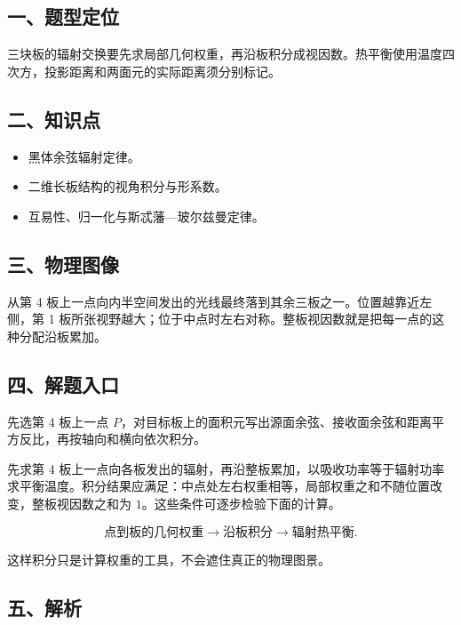 \documentclass[12pt,a4paper,UTF8]{ctexart}
\newcommand{\tightlist}{\setlength{\itemsep}{0pt}\setlength{\parskip}{0pt}}
\begin{document}
\subsection{一、题型定位}\label{ux4e00ux9898ux578bux5b9aux4f4d-5}

三块板的辐射交换要先求局部几何权重，再沿板积分成视因数。热平衡使用温度四次方，投影距离和两面元的实际距离须分别标记。

\subsection{二、知识点}\label{ux4e8cux77e5ux8bc6ux70b9-5}

\begin{itemize}
\tightlist
\item
  黑体余弦辐射定律。
\item
  二维长板结构的视角积分与形系数。
\item
  互易性、归一化与斯忒藩---玻尔兹曼定律。
\end{itemize}

\subsection{三、物理图像}\label{ux4e09ux7269ux7406ux56feux50cf-5}

从第 4
板上一点向内半空间发出的光线最终落到其余三板之一。位置越靠近左侧，第 1
板所张视野越大；位于中点时左右对称。整板视因数就是把每一点的这种分配沿板累加。

\subsection{四、解题入口}\label{ux56dbux89e3ux9898ux5165ux53e3-5}

先选第 4 板上一点
\(P\)，对目标板上的面积元写出源面余弦、接收面余弦和距离平方反比，再按轴向和横向依次积分。

先求第 4
板上一点向各板发出的辐射，再沿整板累加，以吸收功率等于辐射功率求平衡温度。积分结果应满足：中点处左右权重相等，局部权重之和不随位置改变，整板视因数之和为
\(1\)。这些条件可逐步检验下面的计算。

\[\text{点到板的几何权重}\to\text{沿板积分}\to\text{辐射热平衡}.\]

这样积分只是计算权重的工具，不会遮住真正的物理图景。

\subsection{五、解析}\label{ux4e94ux89e3ux6790-5}
\end{document}
